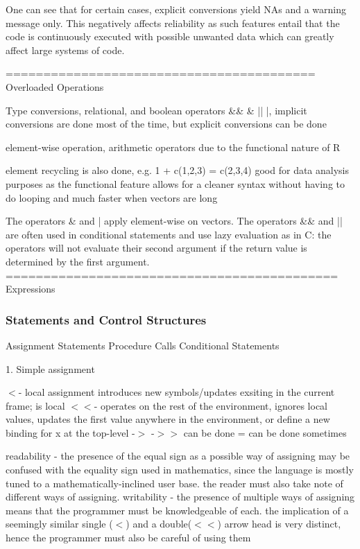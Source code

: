 \documentclass[12pt]{article}
\begin{document}
One can see that for certain cases, explicit conversions yield NAs and a warning message only. This negatively affects reliability as such features entail that the code is continuously executed with possible unwanted data which can greatly affect large systems of code.

=========================================
Overloaded Operations



Type conversions, relational, and boolean operators
 \&\& \& || |, implicit conversions are done most of the time, but explicit conversions can be done

 element-wise operation, arithmetic operators due to the functional nature of R

 element recycling is also done, e.g. 1 + c(1,2,3) = c(2,3,4)
 good for data analysis purposes as the functional feature allows for a cleaner syntax without having to do looping and much faster when vectors are long

 The operators \& and | apply element-wise on vectors. The operators \&\& and || are often used in conditional statements and use lazy evaluation as in C: the operators will not evaluate their second argument if the return value is determined by the first argument.
============================================
Expressions

\subsubsection{Statements and Control Structures}
Assignment Statements
Procedure Calls
Conditional Statements

1. Simple assignment

\(<\)- local assignment introduces new symbols/updates exsiting in the current frame; is local
\(<<\)- operates on the rest of the environment, ignores local values, updates the first value anywhere in the environment, or define a new binding for x at the top-level
-\(>\) -\(>>\) can be done
= can be done sometimes

readability - the presence of the equal sign as a possible way of assigning may be confused with the equality sign used in mathematics, since the language is mostly tuned to a mathematically-inclined user base. the reader must also take note of different ways of assigning.
writability - the presence of multiple ways of assigning means that the programmer must be knowledgeable of each. the implication of a seemingly similar single (\(<\)) and a double(\(<<\)) arrow head is very distinct, hence the programmer must also be careful of using them
\end{document}
